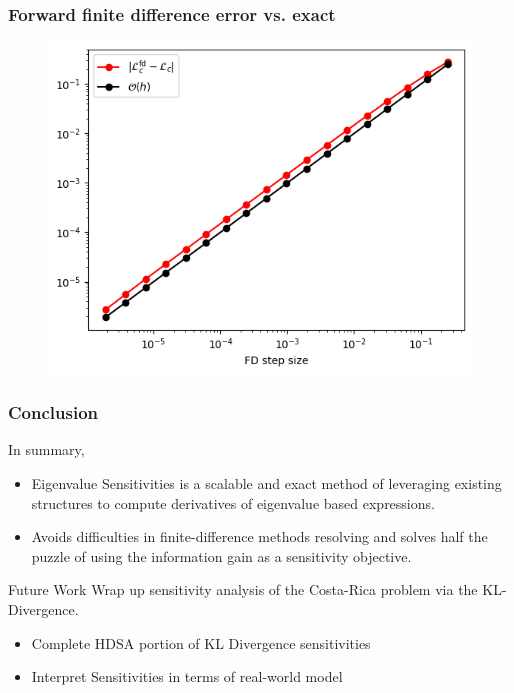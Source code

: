 \documentclass[
  pdf,
  10pt,
  xcolor={svgnames},
]{beamer}
\begin{document}
\begin{frame}
  \frametitle{Forward finite difference error vs. exact}
  \begin{figure}
    \centering
    \includegraphics[width=.65\textwidth]{./resources/infdim_fd_err.png}
  \end{figure}
\end{frame}

\begin{frame}
  \frametitle{Conclusion}
  In summary,
  \begin{itemize}
    \item Eigenvalue Sensitivities is a scalable and exact method of leveraging
          existing structures to compute derivatives of eigenvalue based expressions.
    \item Avoids difficulties in finite-difference methods resolving and solves
          half the puzzle of using the information gain as a sensitivity objective.
  \end{itemize}
  \pause
  \begin{block}{Future Work}
    Wrap up sensitivity analysis of the Costa-Rica problem via the
    KL-Divergence.
    \begin{itemize}
      \item Complete HDSA portion of KL Divergence sensitivities
      \item Interpret Sensitivities in terms of real-world model
    \end{itemize}
  \end{block}
\end{frame}
\end{document}
